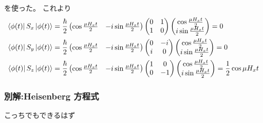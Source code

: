\documentclass[../../master.tex]{subfiles}
\begin{document}
を使った。
これより
\begin{align}
    \bra{\phi(t)}S_x\ket{\phi(t)}
    &= \frac{\hbar}{2}\begin{pmatrix}
        \cos\frac{\mu H_x t}{2} & -i\sin\frac{\mu H_x t}{2}
    \end{pmatrix}
    \begin{pmatrix}
        0 & 1\\
        1 & 0
    \end{pmatrix}
    \begin{pmatrix}
        \cos\frac{\mu H_x t}{2}\\
        i\sin\frac{\mu H_x t}{2}
    \end{pmatrix}=0\\
    \bra{\phi(t)}S_y\ket{\phi(t)}
    &= \frac{\hbar}{2}\begin{pmatrix}
        \cos\frac{\mu H_x t}{2} & -i\sin\frac{\mu H_x t}{2}
    \end{pmatrix}
    \begin{pmatrix}
        0 & -i\\
        i & 0
    \end{pmatrix}
    \begin{pmatrix}
        \cos\frac{\mu H_x t}{2}\\
        i\sin\frac{\mu H_x t}{2}
    \end{pmatrix}=0\\
    \bra{\phi(t)}S_z\ket{\phi(t)}
    &= \frac{\hbar}{2}\begin{pmatrix}
        \cos\frac{\mu H_x t}{2} & -i\sin\frac{\mu H_x t}{2}
    \end{pmatrix}
    \begin{pmatrix}
        1 & 0\\
        0 & -1
    \end{pmatrix}
    \begin{pmatrix}
        \cos\frac{\mu H_x t}{2}\\
        i\sin\frac{\mu H_x t}{2}
    \end{pmatrix}=\frac{1}{2}\cos\mu H_x t
\end{align}
\subsubsection{別解:Heisenberg 方程式}
こっちでもできるはず
\end{document}
